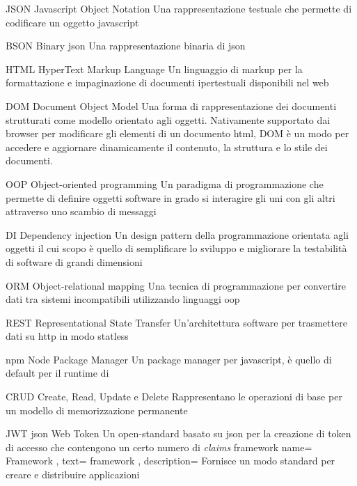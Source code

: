 {JSON}
{Javascript Object Notation}
{Una rappresentazione testuale che permette di codificare un oggetto \gls{javascript}}


{BSON}
{Binary \acrshort{json}}
{Una rappresentazione binaria di \gls{json}}


{HTML}
{HyperText Markup Language}
{Un linguaggio di markup per la formattazione e impaginazione di documenti ipertestuali disponibili nel web}

{DOM}
{Document Object Model}
{Una forma di rappresentazione dei documenti strutturati come modello orientato agli oggetti. Nativamente supportato dai browser per modificare gli elementi di un documento \acrshort{html}, DOM è un modo per accedere e aggiornare dinamicamente il contenuto, la struttura e lo stile dei documenti.}


{OOP}
{Object-oriented programming}
{Un paradigma di programmazione che permette di definire oggetti software in grado si interagire gli uni con gli altri attraverso uno scambio di messaggi}


{DI}
{Dependency injection}
{Un design pattern della programmazione orientata agli oggetti il cui scopo è quello di semplificare lo sviluppo e migliorare la testabilità di software di grandi dimensioni}

{ORM}
{Object-relational mapping}
{Una tecnica di programmazione per convertire dati tra sistemi incompatibili utilizzando linguaggi \gls{oop}}


{REST}
{Representational State Transfer}
{Un'architettura software per trasmettere dati su \acrshort{http} in modo statless}


{npm}
{Node Package Manager}
{Un package manager per \gls{javascript}, è quello di default per il runtime di \nodejs}



{CRUD}
{Create, Read, Update e Delete}
{Rappresentano le operazioni di base per un modello di memorizzazione permanente}


{JWT}
{\acrshort{json} Web Token}
{Un open-standard basato su \acrshort{json} per la creazione di token di accesso che contengono un certo numero di \textit{claims}}
\newglossaryentry
{framework}
{
	name={
		Framework
	},
	text={
		framework
	},
	description={
		Fornisce un modo standard per creare e distribuire applicazioni
	}
}

